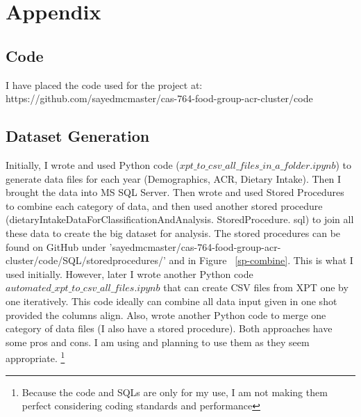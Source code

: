 \pagebreak
\section{Appendix}

\subsection{Code}
I have placed the code used for the project at: https://github.com/sayedmcmaster/cas-764-food-group-acr-cluster/code %



\subsection{Dataset Generation}
Initially, I wrote and used Python code ($xpt\_to\_csv\_all\_files\_in\_a\_folder.ipynb$) to generate data files for each year (Demographics, ACR, Dietary Intake). Then I brought the data into MS SQL Server. Then wrote and used Stored Procedures to combine each category of data, and then used another stored procedure (dietaryIntakeDataForClassificationAndAnalysis. StoredProcedure. sql) to join all these data to create the big dataset for analysis. The stored procedures can be found on GitHub under 'sayedmcmaster/cas-764-food-group-acr-cluster/code/SQL/storedprocedures/' and in Figure ~\ref{sp-combine}. This is what I used initially. However, later I wrote another Python code $automated\_xpt\_to\_csv\_all\_files.ipynb$ that can create CSV files from XPT one by one iteratively. This code ideally can combine all data input given in one shot provided the columns align. Also, wrote another Python code to merge one category of data files (I also have a stored procedure). Both approaches have some pros and cons. I am using and planning to use them as they seem appropriate. \footnote{Because the code and SQLs are only for my use, I am not making them perfect considering coding standards and performance}

